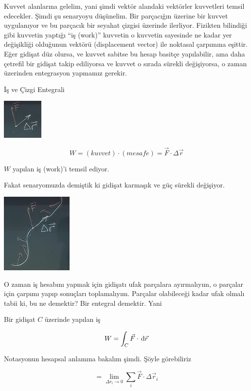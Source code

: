 \documentclass[12pt,fleqn]{article}\usepackage{../../common}
\begin{document}
Kuvvet alanlarına gelelim, yani şimdi vektör alandaki vektörler kuvvetleri
temsil edecekler. Şimdi şu senaryoyu düşünelim. Bir parçacığın üzerine bir
kuvvet uygulanıyor ve bu parçacık bir seyahat çizgisi üzerinde
ilerliyor. Fizikten bilindiği gibi kuvvetin yaptığı ``iş (work)'' kuvvetin
o kuvvetin sayesinde ne kadar yer değişikliği olduğunun vektörü
(displacement vector) ile noktasal çarpımına eşittir. Eğer gidişat düz
olursa, ve kuvvet sabitse bu hesap basitçe yapılabilir, ama daha çetrefil
bir gidişat takip ediliyorsa ve kuvvet o sırada sürekli değişiyorsa, o
zaman üzerinden entegrasyon yapmamız gerekir.

İş ve Çizgi Entegrali

\begin{center}
\includegraphics[height=2cm]{19_8.png}
\end{center}

$$ W = (kuvvet)\cdot(mesafe) = \vec{F}\cdot\Delta\vec{r} $$

$W$ yapılan iş (work)'i temsil ediyor. 

Fakat senaryomuzda demiştik ki gidişat karmaşık ve güç sürekli
değişiyor.

\begin{center}
\includegraphics[height=4cm]{19_9.png}
\end{center}

O zaman iş hesabını yapmak için gidişatı ufak parçalara ayırmalıyım, o
parçalar için çarpımı yapıp sonuçları toplamalıyım. Parçalar olabileceği
kadar ufak olmalı tabii ki, bu ne demektir? Bir entegral demektir. Yani

Bir gidişat $C$ üzerinde yapılan iş 

$$ W = \int_C \vec{F} \cdot \,\mathrm{d}\vec{r} $$

Notasyonun hesapsal anlamına bakalım şimdi. Şöyle görebiliriz

$$ = \lim_{\Delta r_i \to 0} \sum_i  \vec{F} \cdot \Delta\vec{r}_i$$
\end{document}
